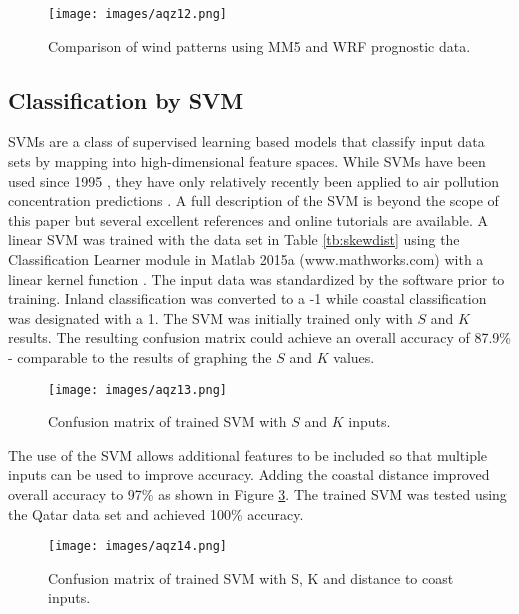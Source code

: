 %
\begin{figure}
\texttt{[image: images/aqz12.png]} 
\caption{Comparison of wind patterns using MM5 and WRF prognostic data.}
\label{fig:12windcompare}
\end{figure}
%

\subsection{Classification by SVM}

SVMs are a class of supervised learning based models that classify input data sets by mapping into high-dimensional feature spaces. While SVMs have been used since 1995 \citep{Cortes1995}, they have only relatively recently been applied to air pollution concentration predictions \citep{Lu2005, Luna2014, Moazami2016}. A full description of the SVM is beyond the scope of this paper but several excellent references and online tutorials are available. A linear SVM was trained with the data set in Table \ref{tb:skewdist} using the Classification Learner module in Matlab 2015a (www.mathworks.com) with a linear kernel function \citep{Yang2011}. The input data was standardized by the software prior to training. Inland classification was converted to a -1 while coastal classification was designated with a 1. The SVM was initially trained only with $S$ and $K$ results. The resulting confusion matrix could achieve an overall accuracy of 87.9\% - comparable to the results of graphing the $S$ and $K$ values.  

%
\begin{figure}
\texttt{[image: images/aqz13.png]} 
\caption{Confusion matrix of trained SVM with $S$ and $K$ inputs.}
\label{fig:13confusionSK}
\end{figure}
%

The use of the SVM allows additional features to be included so that multiple inputs can be used to improve accuracy. Adding the coastal distance improved overall accuracy to 97\% as shown in Figure \ref{fig:14confusionSKdist}. The trained SVM was tested using the Qatar data set and achieved 100\% accuracy. 

%
\begin{figure}
\texttt{[image: images/aqz14.png]} 
\caption{Confusion matrix of trained SVM with S, K and distance to coast inputs.}
\label{fig:14confusionSKdist}
\end{figure}
%
 
